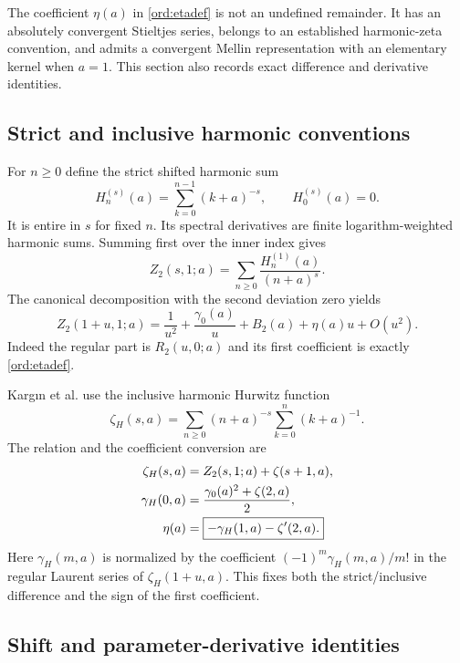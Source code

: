 \documentclass[11pt,letterpaper]{article}
\numberwithin{equation}{section}
\theoremstyle{definition}
\theoremstyle{remark}
\begin{document}
The coefficient $\eta(a)$ in \eqref{ord:etadef} is not an undefined
remainder. It has an absolutely convergent Stieltjes series, belongs
to an established harmonic-zeta convention, and admits a convergent
Mellin representation with an elementary kernel when $a=1$.
This section also records exact difference and derivative identities.

\subsection{Strict and inclusive harmonic conventions}

For $n\ge0$ define the strict shifted harmonic sum
\[
 H_n^{(s)}(a)=\sum_{k=0}^{n-1}(k+a)^{-s},\qquad H_0^{(s)}(a)=0.
\]
It is entire in $s$ for fixed $n$. Its spectral derivatives are
finite logarithm-weighted harmonic sums. Summing first over the
inner index gives
\begin{equation}\label{harm:strict}
 Z_2(s,1;a)=\sum_{n\ge0}\frac{H_n^{(1)}(a)}{(n+a)^s}.
\end{equation}
The canonical decomposition with the second deviation zero yields
\begin{equation}\label{harm:etaLaurent}
 Z_2(1+u,1;a)=\frac1{u^2}+\frac{\gamma_0(a)}u+
 B_2(a)+\eta(a)u+O(u^2).
\end{equation}
Indeed the regular part is $R_2(u,0;a)$ and its first coefficient is
exactly \eqref{ord:etadef}.

Karg\i n et al. use the inclusive harmonic Hurwitz function
\cite{Kargin}
\[
 \zeta_H(s,a)=\sum_{n\ge0}(n+a)^{-s}
                           \sum_{k=0}^{n}(k+a)^{-1}.
\]
The relation and the coefficient conversion are
\begin{align}
 \zeta_H(s,a)&=Z_2(s,1;a)+\zeta(s+1,a),\label{harm:inclusive}\\
 \gamma_H(0,a)&=\frac{\gamma_0(a)^2+\zeta(2,a)}2,\notag\\
 \eta(a)&=\boxed{-\gamma_H(1,a)-\zeta'(2,a).}\label{harm:conversion}
\end{align}
Here $\gamma_H(m,a)$ is normalized by the coefficient
$(-1)^m\gamma_H(m,a)/m!$ in the regular Laurent series of
$\zeta_H(1+u,a)$. This fixes both the strict/inclusive difference and
the sign of the first coefficient.

\subsection{Shift and parameter-derivative identities}
\end{document}
